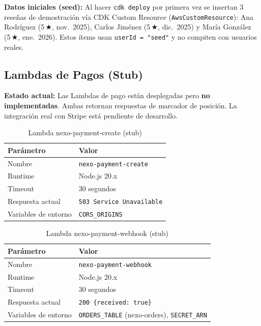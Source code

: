 \documentclass[12pt,a4paper]{article}
\begin{document}
\begin{nexobox}
\textbf{Datos iniciales (seed):} Al hacer \texttt{cdk deploy} por primera vez se insertan
3 reseñas de demostración vía CDK Custom Resource (\texttt{AwsCustomResource}):
Ana Rodríguez (5\,★, nov.\ 2025), Carlos Jiménez (5\,★, dic.\ 2025) y María González
(5\,★, ene.\ 2026). Estos ítems usan \texttt{userId = "seed"} y no compiten con
usuarios reales.
\end{nexobox}

\subsection{Lambdas de Pagos (Stub)}

\begin{nexobox}
\textbf{Estado actual:} Las Lambdas de pago están desplegadas pero \textbf{no implementadas}.
Ambas retornan respuestas de marcador de posición. La integración real con Stripe está
pendiente de desarrollo.
\end{nexobox}

\begin{table}[H]
\centering
\begin{tabular}{@{}ll@{}}
\toprule
\textbf{Parámetro} & \textbf{Valor} \\
\midrule
Nombre & \texttt{nexo-payment-create} \\
Runtime & Node.js 20.x \\
Timeout & 30 segundos \\
Respuesta actual & \texttt{503 Service Unavailable} \\
Variables de entorno & \texttt{CORS\_ORIGINS} \\
\bottomrule
\end{tabular}
\caption{Lambda nexo-payment-create (stub)}
\end{table}

\begin{table}[H]
\centering
\begin{tabular}{@{}ll@{}}
\toprule
\textbf{Parámetro} & \textbf{Valor} \\
\midrule
Nombre & \texttt{nexo-payment-webhook} \\
Runtime & Node.js 20.x \\
Timeout & 30 segundos \\
Respuesta actual & \texttt{200 \{received: true\}} \\
Variables de entorno & \texttt{ORDERS\_TABLE} (nexo-orders), \texttt{SECRET\_ARN} \\
\bottomrule
\end{tabular}
\caption{Lambda nexo-payment-webhook (stub)}
\end{table}
\end{document}
